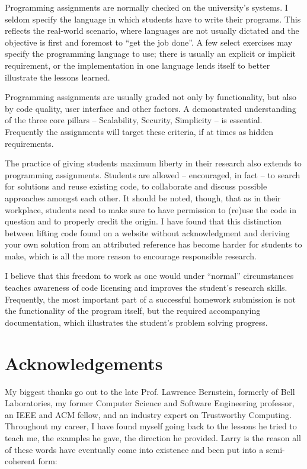 Programming assignments are normally checked on the
university's systems.  I seldom specify the language
in which students have to write their programs.  This
reflects the real-world scenario, where languages are
not usually dictated and the objective is first and
foremost to ``get the job done''.  A few select
exercises may specify the programming language to use;
there is usually an explicit or implicit requirement,
or the implementation in one language lends itself to
better illustrate the lessons learned.

Programming assignments are usually graded not only by
functionality, but also by code quality, user
interface and other factors.  A demonstrated
understanding of the three core pillars --
Scalability, Security, Simplicity -- is essential.
Frequently the assignments will target these criteria,
if at times as hidden requirements.

The practice of giving students maximum liberty in
their research also extends to programming
assignments.  Students are allowed -- encouraged, in
fact -- to search for solutions and reuse existing
code, to collaborate and discuss possible approaches
amongst each other.  It should be noted, though, that
as in their workplace, students need to make sure to
have permission to (re)use the code in question and to
properly credit the origin.  I have found that this
distinction between lifting code found on a website
without acknowledgment and deriving your own solution
from an attributed reference has become harder for
students to make, which is all the more reason to
encourage responsible research.

I believe that this freedom to work as one would under
``normal'' circumstances teaches awareness of code
licensing and improves the student's research skills.
Frequently, the most important part of a successful
homework submission is not the functionality of the
program itself, but the required accompanying
documentation, which illustrates the student's problem
solving progress.

\section*{Acknowledgements}

My biggest thanks go out to the late Prof. Lawrence
Bernstein, formerly
of Bell Laboratories, my
former Computer Science and Software Engineering
professor, an IEEE and ACM
fellow, and an industry expert on Trustworthy
Computing.  Throughout my career, I have found myself
going back to the lessons he tried to teach me, the
examples he gave, the direction he provided.  Larry is
the reason all of these words have eventually come
into existence and been put into a semi-coherent
form:

